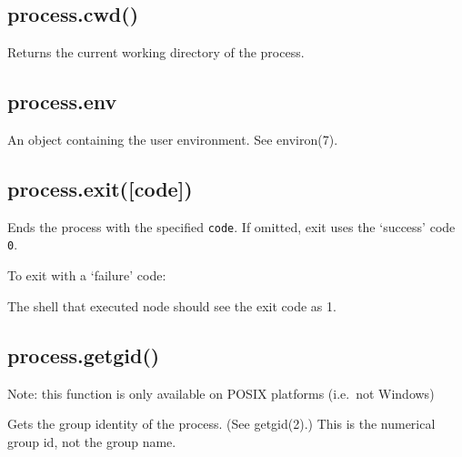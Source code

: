 \subsection{process.cwd()}

Returns the current working directory of the process.

\begin{Shaded}
\begin{Highlighting}[]
\NormalTok{(} \NormalTok{+ }\NormalTok{());}
\end{Highlighting}
\end{Shaded}

\subsection{process.env}

An object containing the user environment. See environ(7).

\subsection{process.exit({[}code{]})}

Ends the process with the specified \texttt{code}. If omitted, exit uses
the `success' code \texttt{0}.

To exit with a `failure' code:

\begin{Shaded}
\begin{Highlighting}[]
\NormalTok{(}\NormalTok{);}
\end{Highlighting}
\end{Shaded}

The shell that executed node should see the exit code as 1.

\subsection{process.getgid()}

Note: this function is only available on POSIX platforms (i.e.~not
Windows)

Gets the group identity of the process. (See getgid(2).) This is the
numerical group id, not the group name.

\begin{Shaded}
\begin{Highlighting}[]
 \NormalTok{(}\NormalTok{) \{}
  \NormalTok{(} \NormalTok{+ }\NormalTok{());}
\NormalTok{\}}
\end{Highlighting}
\end{Shaded}

